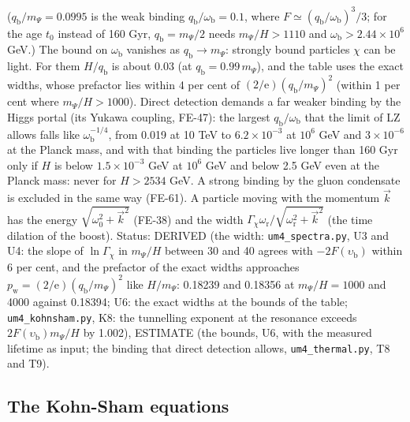 \documentclass[
  10pt,
]{article}
\begin{document}
(\(q_{\mathrm{b}}/m_\Psi = 0.0995\) is the weak binding
\(q_{\mathrm{b}}/\omega_{\mathrm{b}} = 0.1\), where
\(F \simeq (q_{\mathrm{b}}/\omega_{\mathrm{b}})^3/3\); for the age
\(t_0\) instead of 160 Gyr, \(q_{\mathrm{b}} = m_\Psi/2\) needs
\(m_\Psi/H > 1110\) and \(\omega_{\mathrm{b}} > 2.44\times10^6\) GeV.)
The bound on \(\omega_{\mathrm{b}}\) vanishes as
\(q_{\mathrm{b}} \to m_\Psi\): strongly bound particles \(\chi\) can be
light. For them \(H/q_{\mathrm{b}}\) is about 0.03 (at
\(q_{\mathrm{b}} = 0.99\,m_\Psi\)), and the table uses the exact widths,
whose prefactor lies within 4 per cent of
\((2/\mathrm{e})(q_{\mathrm{b}}/m_\Psi)^2\) (within 1 per cent where
\(m_\Psi/H > 1000\)). Direct detection demands a far weaker binding by
the Higgs portal (its Yukawa coupling, FE-47): the largest
\(q_{\mathrm{b}}/\omega_{\mathrm{b}}\) that the limit of LZ allows falls
like \(\omega_{\mathrm{b}}^{-1/4}\), from 0.019 at 10 TeV to
\(6.2\times10^{-3}\) at \(10^6\) GeV and \(3\times10^{-6}\) at the
Planck mass, and with that binding the particles live longer than 160
Gyr only if \(H\) is below \(1.5\times10^{-3}\) GeV at \(10^6\) GeV and
below 2.5 GeV even at the Planck mass: never for \(H > 2534\) GeV. A
strong binding by the gluon condensate is excluded in the same way
(FE-61). A particle moving with the momentum \(\vec k\) has the energy
\(\sqrt{\omega_0^2 + \vec k^2}\) (FE-38) and the width
\(\Gamma_\chi\omega_{\mathrm{r}}/\sqrt{\omega_{\mathrm{r}}^2 + \vec k^2}\)
(the time dilation of the boost). Status: DERIVED (the width:
\texttt{um4\_spectra.py}, U3 and U4: the slope of \(\ln\Gamma_\chi\) in
\(m_\Psi/H\) between 30 and 40 agrees with
\(-2F(\upsilon_{\mathrm{b}})\) within 6 per cent, and the prefactor of
the exact widths approaches
\(p_{\mathrm{w}} = (2/\mathrm{e})(q_{\mathrm{b}}/m_\Psi)^2\) like
\(H/m_\Psi\): 0.18239 and 0.18356 at \(m_\Psi/H = 1000\) and 4000
against 0.18394; U6: the exact widths at the bounds of the table;
\texttt{um4\_kohnsham.py}, K8: the tunnelling exponent at the resonance
exceeds \(2F(\upsilon_{\mathrm{b}})m_\Psi/H\) by 1.002), ESTIMATE (the
bounds, U6, with the measured lifetime as input; the binding that direct
detection allows, \texttt{um4\_thermal.py}, T8 and T9).

\hypertarget{the-kohn-sham-equations}{%
\subsection{The Kohn-Sham equations}\label{the-kohn-sham-equations}}
\end{document}
